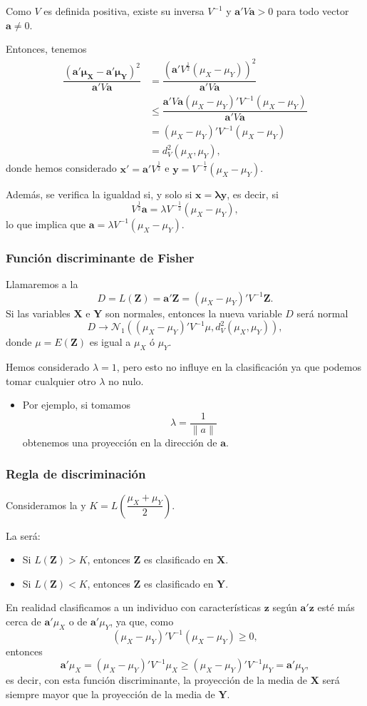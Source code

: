 Como $V$ es definida positiva, existe su inversa $V^{-1}$ y $\mathbf{a'}V\mathbf{a}>0$ para todo vector $ \mathbf{a}\neq0$.

Entonces, tenemos \begin{align*}
	\dfrac{(\mathbf{a'\mu_X-a'\mu_Y})^2}{\mathbf{a'}V\mathbf{a}}&=\dfrac{\left(\mathbf{a'}V^{\frac{1}{2}}(\mu_X-\mu_Y)\right)^2}{\mathbf{a'}V\mathbf{a}}\\
	&\le\dfrac{\mathbf{a'}V\mathbf{a}(\mu_X-\mu_Y)'V^{-1}(\mu_X-\mu_Y)}{\mathbf{a'}V\mathbf{a}}\\
	&=(\mu_X-\mu_Y)'V^{-1}(\mu_X-\mu_Y)\\
	&=d_V^2(\mu_X,\mu_Y),
\end{align*}donde hemos considerado $\mathbf{x'}=\mathbf{a'}V^{\frac{1}{2}}$ e $\mathbf{y}=V^{-\frac{1}{2}}(\mu_X-\mu_Y)$.

Además, se verifica la igualdad si, y solo si $\mathbf{x=\lambda y}$, es decir, si \[ V^{\frac{1}{2}}\mathbf{a}=\lambda V^{-\frac{1}{2}}(\mu_X-\mu_Y), \]lo que implica que $\mathbf{a}=\lambda V^{-1}(\mu_X-\mu_Y)$.
\subsubsection{Función discriminante de Fisher}
Llamaremos  a la \va \[ D=L(\mathbf{Z})=\mathbf{a'Z}=(\mu_X-\mu_Y)'V^{-1}\mathbf{Z}. \]
Si las variables $\mathbf{X}$ e $\mathbf{Y}$ son normales, entonces la nueva variable $D$ será normal \[ D\longrightarrow\mathcal{N}_1\left((\mu_X-\mu_Y)'V^{-1}\mu,d_V^2(\mu_X,\mu_Y)\right), \]donde $\mu=E(\mathbf{Z})$ es igual a $\mu_X$ ó $\mu_Y$.

Hemos considerado $\lambda=1$, pero esto no influye en la clasificación ya que podemos tomar cualquier otro $\lambda$ no nulo.
\begin{itemize}
	\item Por ejemplo, si tomamos \[ \lambda=\dfrac{1}{\|a\|} \]obtenemos una proyección en la dirección de $\mathbf{a}$.
\end{itemize}
\subsubsection{Regla de discriminación}
Consideramos la  y $K=L\left(\dfrac{\mu_X+\mu_Y}{2}\right)$.

La  será:
\begin{itemize}
	\item Si $L(\mathbf{Z})>K$, entonces $\mathbf{Z}$ es clasificado en $\mathbf{X}$.
	\item Si $L(\mathbf{Z})<K$, entonces $\mathbf{Z}$ es clasificado en $\mathbf{Y}$.
\end{itemize}
En realidad clasificamos a un individuo con características $\mathbf{z}$ según $\mathbf{a'z}$ esté más cerca de $\mathbf{a'}\mu_X$ o de $\mathbf{a'}\mu_Y$, ya que, como \[ (\mu_X-\mu_Y)'V^{-1}(\mu_X-\mu_Y)\ge0, \]entonces \[ \mathbf{a'}\mu_X=(\mu_X-\mu_Y)'V^{-1}\mu_X\ge(\mu_X-\mu_Y)'V^{-1}\mu_Y=\mathbf{a'}\mu_Y,\]es decir, con esta función discriminante, la proyección de la media de $\mathbf{X}$ será siempre mayor que la proyección de la media de $\mathbf{Y}$.

